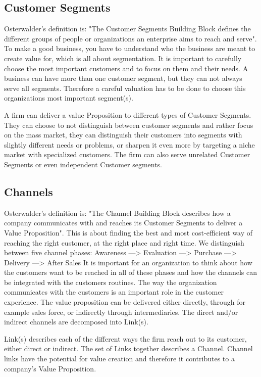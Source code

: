 \subsection{Customer Segments}
Osterwalder's definition is: "The Customer Segments Building Block defines the different groups of people or organizations an enterprise aims to reach and serve". To make a good business, you have to understand who the business are meant to create value for, which is all about segmentation. It is important to carefully choose the most important customers and to focus on them and their needs. A business can have more than one customer segment, but they can not always serve all segments. Therefore a careful valuation has to be done to choose this organizations most important segment(s).  

A firm can deliver a value Proposition to different types of Customer Segments. They can choose to not distinguish between customer segments and rather focus on the mass market, they can distinguish their customers into segments with slightly different needs or problems, or sharpen it even more by targeting a niche market with specialized customers. The firm can also serve unrelated Customer Segments or even independent Customer segments. 

\subsection{Channels}
Osterwalder's definition is: "The Channel Building Block describes how a company communicates with and reaches its Customer Segments to deliver a Value Proposition". This is about finding the best and most cost-efficient way of reaching the right customer, at the right place and right time. We distinguish between five channel phases: 
Awareness ---> Evaluation ---> Purchase ---> Delivery ---> After Sales
It is important for an organization to think about how the customers want to be reached in all of these phases and how the channels can be integrated with the customers routines. The way the organization communicates with the customers is an important role in the customer experience. The value proposition can be delivered either directly, through for example sales force, or indirectly through intermediaries. The direct and/or indirect channels are decomposed into Link(s).

Link(s) describes each of the different ways the firm reach out to its customer, either direct or indirect. The set of Links together describes a Channel. Channel links have the potential for value creation and therefore it contributes to a company's Value Proposition.

